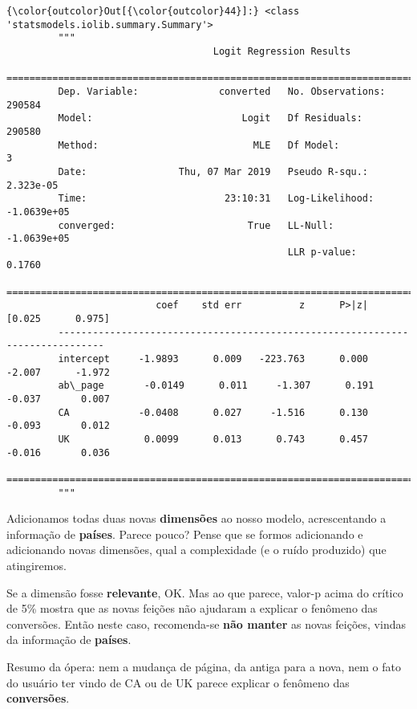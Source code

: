 \documentclass[11pt]{article}
\begin{document}
\begin{Verbatim}[commandchars=\\\{\}]
{\color{outcolor}Out[{\color{outcolor}44}]:} <class 'statsmodels.iolib.summary.Summary'>
         """
                                    Logit Regression Results                           
         ==============================================================================
         Dep. Variable:              converted   No. Observations:               290584
         Model:                          Logit   Df Residuals:                   290580
         Method:                           MLE   Df Model:                            3
         Date:                Thu, 07 Mar 2019   Pseudo R-squ.:               2.323e-05
         Time:                        23:10:31   Log-Likelihood:            -1.0639e+05
         converged:                       True   LL-Null:                   -1.0639e+05
                                                 LLR p-value:                    0.1760
         ==============================================================================
                          coef    std err          z      P>|z|      [0.025      0.975]
         ------------------------------------------------------------------------------
         intercept     -1.9893      0.009   -223.763      0.000      -2.007      -1.972
         ab\_page       -0.0149      0.011     -1.307      0.191      -0.037       0.007
         CA            -0.0408      0.027     -1.516      0.130      -0.093       0.012
         UK             0.0099      0.013      0.743      0.457      -0.016       0.036
         ==============================================================================
         """
\end{Verbatim}
            
    Adicionamos todas duas novas \textbf{dimensões} ao nosso modelo,
acrescentando a informação de \textbf{países}. Parece pouco? Pense que
se formos adicionando e adicionando novas dimensões, qual a complexidade
(e o ruído produzido) que atingiremos.

Se a dimensão fosse \textbf{relevante}, OK. Mas ao que parece, valor-p
acima do crítico de 5\% mostra que as novas feições não ajudaram a
explicar o fenômeno das conversões. Então neste caso, recomenda-se
\textbf{não manter} as novas feições, vindas da informação de
\textbf{países}.

Resumo da ópera: nem a mudança de página, da antiga para a nova, nem o
fato do usuário ter vindo de CA ou de UK parece explicar o fenômeno das
\textbf{conversões}.
\end{document}
